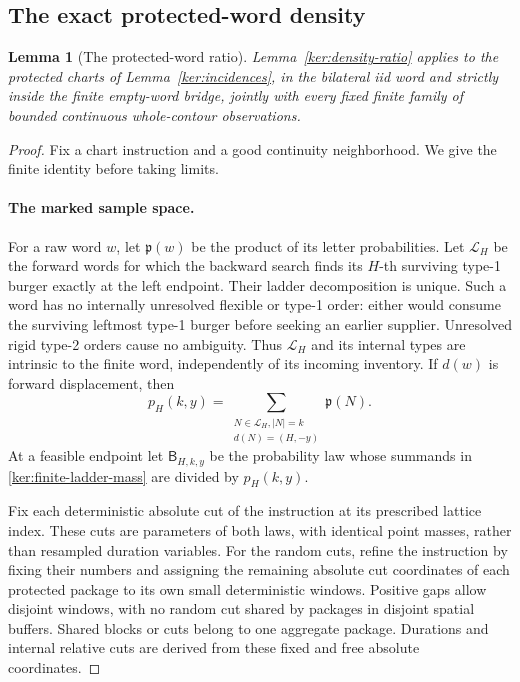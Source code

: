 \documentclass[11pt]{article}
\numberwithin{equation}{section}
\newtheorem{lemma}[theorem]{Lemma}
\theoremstyle{definition}
\theoremstyle{remark}
\newcommand{\1}{\mathbf 1}
\begin{document}
\subsection{The exact protected-word density}

\begin{lemma}[The protected-word ratio]\label{ker:word-ratio}
Lemma~\ref{ker:density-ratio} applies to the protected charts of
Lemma~\ref{ker:incidences}, in the bilateral iid word and strictly
inside the finite empty-word bridge, jointly with every fixed finite
family of bounded continuous whole-contour observations.
\end{lemma}

\begin{proof}
Fix a chart instruction and a good continuity neighborhood.  We give
the finite identity before taking limits.

\paragraph{The marked sample space.}
For a raw word \(w\), let \(\mathfrak p(w)\) be the product of its
letter probabilities.  Let \(\mathcal L_H\) be the forward words for
which the backward search finds its \(H\)-th surviving type-1 burger
exactly at the left endpoint.  Their ladder decomposition is unique.
Such a word has no internally unresolved flexible or type-1 order:
either would consume the surviving leftmost type-1 burger before
seeking an earlier supplier.  Unresolved rigid type-2 orders cause
no ambiguity.  Thus \(\mathcal L_H\) and its internal types are
intrinsic to the finite word, independently of its incoming inventory.
If \(d(w)\) is forward displacement, then
\begin{equation}\label{ker:finite-ladder-mass}
 p_H(k,y)=\sum_{\substack{N\in\mathcal L_H, |N|=k\\
                         d(N)=(H,-y)}}\mathfrak p(N).
\end{equation}
At a feasible endpoint let \(\mathsf B_{H,k,y}\) be the probability
law whose summands in \eqref{ker:finite-ladder-mass} are divided by
\(p_H(k,y)\).

Fix each deterministic absolute cut of the instruction at its
prescribed lattice index. These cuts are parameters of both laws,
with identical point masses, rather than resampled duration variables.
For the random cuts, refine the instruction by fixing their numbers
and assigning the remaining absolute cut coordinates of each
protected package to its own small deterministic windows. Positive
gaps allow disjoint windows, with no random cut shared by packages
in disjoint spatial buffers. Shared blocks or cuts belong to one
aggregate package. Durations and internal relative cuts are derived
from these fixed and free absolute coordinates.


\end{proof}
\end{document}
